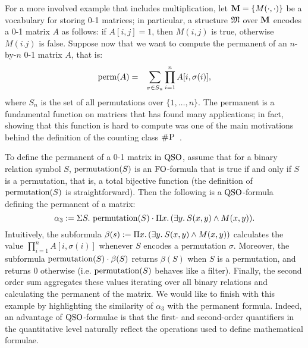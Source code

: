 \begin{example}\label{exa-perm}
For a more involved example that includes multiplication, let $\mathbf{M} = \{M(\cdot,\cdot)\}$ be a vocabulary for storing 0-1 matrices; in particular, a structure $\mathfrak{M}$ over $\mathbf{M}$ encodes a 0-1 matrix $A$ as follows: if $A[i,j] = 1$, then $M(i,j)$ is true, otherwise $M(i.j)$ is false.
Suppose now that we want to compute the permanent of an $n$-by-$n$ 0-1 matrix $A$, that is:
\begin{eqnarray*}
\operatorname{perm}(A) & = & \sum_{\sigma \in S_n} \prod_{i=1}^n A[i, \sigma(i)],  
\end{eqnarray*}
where $S_n$ is the set of all permutations over $\{1, \ldots, n\}$.
The permanent is a fundamental function on matrices that has found many applications;
in fact, showing that this function is hard to compute was one of the main motivations behind the definition of the counting class $\text{\sc \#P}$~\cite{Valiant79}.

To define the permanent of a 0-1 matrix in ${\rm QSO}$, assume that for a binary relation symbol $S$, $\operatorname{permutation}(S)$ is an ${\rm FO}$-formula that is true if and only if $S$ is a permutation, that is, a total bijective function (the definition of $\operatorname{permutation}(S)$ is straightforward).
Then the following is a ${\rm QSO}$-formula defining the permanent of a matrix:
\[
\alpha_3 := \Sigma{S}.\, \operatorname{permutation}(S) \cdot \Pi{x}.\, (\exists{y}.\: S(x,y) \wedge M(x,y)).
\]
Intuitively, the subformula $\beta(s) := \Pi{x}.\, (\exists{y}.\: S(x,y) \wedge M(x,y))$ calculates the value $\prod_{i=1}^n A[i, \sigma(i)]$ whenever $S$ encodes a permutation $\sigma$.
Moreover, the subformula $\operatorname{permutation}(S) \cdot \beta(S)$ returns $\beta(S)$ when $S$ is a permutation, and returns $0$ otherwise (i.e. $\operatorname{permutation}(S)$ behaves like a filter). 
Finally, the second order sum aggregates these values iterating over all binary relations and calculating the permanent of the matrix.
We would like to finish with this example by highlighting the similarity of $\alpha_3$ with the permanent formula. 
Indeed, an advantage of ${\rm QSO}$-formulae is that the first- and second-order quantifiers in the quantitative level naturally reflect the operations used to define mathematical formulae.
\end{example}

